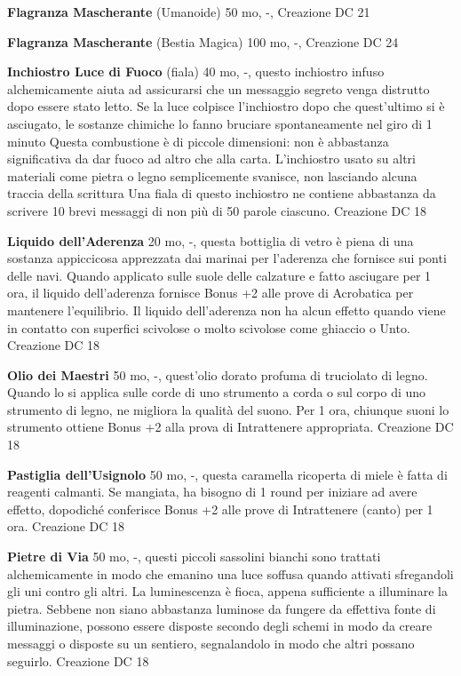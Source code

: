 \documentclass[a4paper,11pt,twoside,openany]{book}
\begin{document}
{\textbf{Flagranza Mascherante} (Umanoide) 50 mo, -, Creazione DC 21

\textbf{Flagranza Mascherante} (Bestia Magica) 100 mo, -, Creazione DC 24

\textbf{Inchiostro Luce di Fuoco} (fiala) 40 mo, -, questo inchiostro infuso alchemicamente aiuta ad assicurarsi che un messaggio segreto venga distrutto dopo essere stato letto. Se la luce colpisce l'inchiostro dopo che quest'ultimo si è asciugato, le sostanze chimiche lo fanno bruciare spontaneamente nel giro di 1 minuto
Questa combustione è di piccole dimensioni: non è abbastanza significativa da dar fuoco ad altro che alla carta. L'inchiostro usato su altri materiali come pietra o legno semplicemente svanisce, non lasciando alcuna traccia della scrittura
 Una fiala di questo inchiostro ne contiene abbastanza da scrivere 10 brevi messaggi di non più di 50 parole ciascuno. Creazione DC 18

\textbf{Liquido dell'Aderenza} 20 mo, -, questa bottiglia di vetro è piena di una sostanza appiccicosa apprezzata dai marinai per l'aderenza che fornisce sui ponti delle navi. Quando applicato sulle suole delle calzature e fatto asciugare per 1 ora, il liquido dell'aderenza fornisce Bonus +2 alle prove di Acrobatica per mantenere l'equilibrio.
Il liquido dell'aderenza non ha alcun effetto quando viene in contatto con superfici scivolose o molto scivolose come ghiaccio o Unto. Creazione DC 18

\textbf{Olio dei Maestri} 50 mo, -, quest'olio dorato profuma di truciolato di legno. Quando lo si applica sulle corde di uno strumento a corda o sul corpo di uno strumento di legno, ne migliora la qualità del suono. Per 1 ora, chiunque suoni lo strumento ottiene Bonus +2 alla prova di Intrattenere appropriata. Creazione DC 18

\textbf{Pastiglia dell'Usignolo} 50 mo, -, questa caramella ricoperta di miele è fatta di reagenti calmanti. Se mangiata, ha bisogno di 1 round per iniziare ad avere effetto, dopodiché conferisce Bonus +2 alle prove di Intrattenere (canto) per 1 ora. Creazione DC 18

\textbf{Pietre di Via} 50 mo, -, questi piccoli sassolini bianchi sono trattati alchemicamente in modo che emanino una luce soffusa quando attivati sfregandoli gli uni contro gli altri. La luminescenza è fioca, appena sufficiente a illuminare la pietra.
Sebbene non siano abbastanza luminose da fungere da effettiva fonte di illuminazione, possono essere disposte secondo degli schemi in modo da creare messaggi o disposte su un sentiero, segnalandolo in modo che altri possano seguirlo. Creazione DC 18

}
\end{document}
